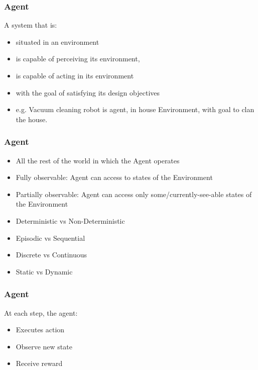 \begin{frame}[fragile]\frametitle{Agent}

A system that is:

\begin{itemize}
\item situated in an environment
\item is capable of perceiving its environment,
\item is capable of acting in its environment
\item with the goal of satisfying its design objectives
\item e.g. Vacuum cleaning robot is agent, in house Environment, with goal to clan the house.
\end{itemize}

\end{frame}

\begin{frame}[fragile]\frametitle{Agent}

\begin{itemize}
\item All the rest of the world in which the Agent operates
\item Fully observable: Agent can access to states of the Environment
\item Partially observable: Agent can access only some/currently-see-able states of the Environment
\item Deterministic vs Non-Deterministic
\item Episodic vs Sequential
\item Discrete vs Continuous
\item Static vs Dynamic
\end{itemize}

\end{frame}

\begin{frame}[fragile]\frametitle{Agent}

At each step, the agent:
\begin{itemize}
\item Executes action
\item Observe new state
\item Receive reward
\end{itemize}

\end{frame}

